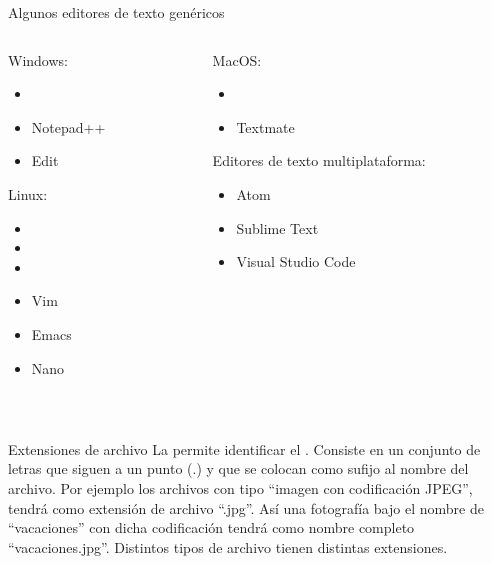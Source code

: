 \begin{frame}{Algunos editores de texto genéricos}
  \begin{columns}
    \begin{column}{0.5\textwidth}
      Windows:
      \begin{itemize}
        \item {}
        \item Notepad++
        \item Edit
      \end{itemize}
      Linux:
      \begin{itemize}
        \item {}
        \item {}
        \item {}
        \item Vim
        \item Emacs
        \item Nano
      \end{itemize}
    \end{column}
    \begin{column}{0.5\textwidth}
      MacOS:
      \begin{itemize}
        \item {}
        \item Textmate
      \end{itemize}
      Editores de texto multiplataforma:
      \begin{itemize}
        \item Atom
        \item Sublime Text
        \item Visual Studio Code
      \end{itemize}
    \end{column}
  \end{columns}
  ~\jump
  \centerline{}
\end{frame}


\begin{frame}{Extensiones de archivo}
  La  permite identificar el .
  Consiste en un conjunto de letras que siguen a un punto (.) y que se colocan
  como sufijo al nombre del archivo.
  \jump
  Por ejemplo los archivos con tipo ``imagen con codificación JPEG'', tendrá como
  extensión de archivo ``.jpg''.
  \jump
  Así una fotografía bajo el nombre de ``vacaciones'' con dicha codificación
  tendrá como nombre completo ``vacaciones.jpg''.
  \jump
  Distintos tipos de archivo tienen distintas extensiones.
\end{frame}

